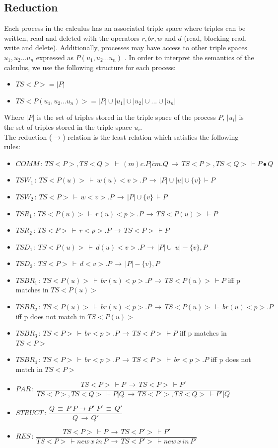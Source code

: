\subsection{Reduction}
Each process in the calculus has an associated triple space where triples can be written, read and deleted with the operators $r,br,w$ and $d$ (read, blocking read, write and delete). Additionally, processes may have access to other triple spaces $u_1,u_2 ... u_n$ expressed as $P(u_1,u_2 ... u_n)$ . In order to interpret the semantics of the calculus, we use the following structure for each process:
\begin{itemize}
  \item $TS<P> = |P|$
  \item $TS<P(u_1,u_2...u_n)> = |P| \cup |u_1| \cup |u_2| \cup ... \cup |u_n|$
\end{itemize}
Where $|P|$ is the set of triples stored in the triple space of the process $P$, $|u_i|$ is the set of triples stored in the triple space $u_i$.\\
The reduction ($\longrightarrow$) relation \cite{Sewell00appliedpi;} is the least relation which satisfies the following rules:
\begin{itemize}
  \item $COMM\,:\,TS<P>,TS<Q>\,\vdash\,(m)c.P|\overline{c}m.Q\,\longrightarrow\,TS<P>,TS<Q>\,\vdash P \bullet Q$
  \item $TSW_1\,:\,TS<P(u)>\,\vdash\,w(u)<v>.P\,\longrightarrow\, |P| \cup |u| \cup \{ v \}\,\vdash P$
  \item $TSW_2\,:\,TS<P>\,\vdash\,w<v>.P\,\longrightarrow\, |P| \cup \{ v \}\, \vdash P$
  \item $TSR_1\,:\,TS<P(u)>\,\vdash\,r(u)<p>.P\,\longrightarrow\, TS<P(u)>\,\vdash P$
  \item $TSR_2\,:\,TS<P>\,\vdash\,r<p>.P\,\longrightarrow\, TS<P>\,\vdash P$
  \item $TSD_1\,:\,TS<P(u)>\,\vdash\,d(u)<v>.P\,\longrightarrow\, |P| \cup |u| - \{v\},P$
  \item $TSD_2\,:\,TS<P>\,\vdash\,d<v>.P\,\longrightarrow\, |P| - \{v\},P$
  \item $TSBR_1\,:\,TS<P(u)>\,\vdash\,br(u)<p>.P\,\longrightarrow\, TS<P(u)>\,\vdash P $ iff p matches in $TS<P(u)>$
  \item $TSBR_2\,:\,TS<P(u)>\,\vdash\,br(u)<p>.P\,\longrightarrow\, TS<P(u)>\,\vdash\,br(u)<p>.P $ iff p does not match in $TS<P(u)>$
  \item $TSBR_3\,:\,TS<P>\,\vdash\,br<p>.P\,\longrightarrow\, TS<P>\,\vdash P$ iff p matches in $TS<P>$
  \item $TSBR_4\,:\,TS<P>\,\vdash\,br<p>.P\,\longrightarrow\, TS<P>\,\vdash\,br<p>.P$ iff p does not match in $TS<P>$
  \item $PAR\,:\,\dfrac{TS<P>\,\vdash P\,\rightarrow\,TS<P>\,\vdash P'}{TS<P>, TS<Q>\,\vdash P | Q \, \rightarrow \, TS<P'>,TS<Q>\,\vdash P' | Q }$
  \item $STRUCT\,:\,\dfrac{Q \, \equiv \, P \; P \rightarrow P' \; P' \, \equiv \, Q'}{Q \, \rightarrow \, Q'}$
  \item $RES\,:\,\dfrac{TS<P>\,\vdash P\,\rightarrow\,TS<P'>\,\vdash P'}{TS<P>\,\vdash new\,x\,in\,P\,\rightarrow\,TS<P'>\,\vdash new\,x\,in\,P'}$
\end{itemize}
